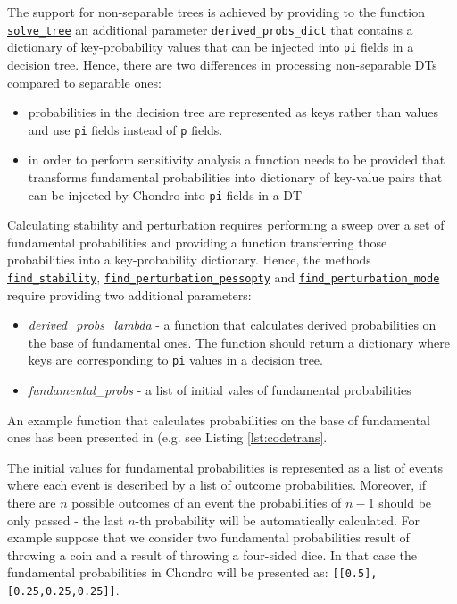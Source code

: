 \documentclass[a4paper,10pt,english]{sphinxmanual}
\begin{document}
The support for non-separable trees is achieved by providing to the function \hyperref[index:chondro.solve_tree]{\texttt{solve\_tree}} an additional parameter \texttt{derived\_probs\_dict} that contains a dictionary of key-probability values that can be injected into \texttt{pi} fields in a decision tree. Hence, there are two differences in processing non-separable DTs compared to separable ones:
\begin{itemize}
	\item probabilities in the decision tree are represented as keys rather than values and use \texttt{pi} fields instead of \texttt{p} fields. 
	\item in order to perform sensitivity analysis a function needs to be provided that transforms fundamental probabilities into dictionary of key-value pairs that can be injected by Chondro into \texttt{pi} fields in a DT
\end{itemize}


Calculating stability and perturbation requires performing a sweep over a set of fundamental probabilities and providing a function transferring those probabilities into a key-probability dictionary. Hence, the methods  \hyperref[index:chondro.find_stability]{\texttt{find\_stability}},  \hyperref[index:chondro.find_perturbation_pessopty]{
		\texttt{find\_perturbation\_pessopty}} and \hyperref[index:chondro.find_perturbation_mode]{
		\texttt{find\_perturbation\_mode}} require providing two additional parameters:
\begin{itemize}
	\item \emph{derived\_probs\_lambda} - a function that calculates derived probabilities     on the  base of fundamental ones. The function should return a dictionary where keys are corresponding to \texttt{pi} values in a decision tree.
	
	\item \emph{fundamental\_probs} - a list of initial vales of fundamental probabilities
\end{itemize}
	
An example function that calculates probabilities on the base of fundamental ones has been presented in (e.g. see Listing \ref{lst:codetrans}. 

The initial values for fundamental probabilities is represented as a list of events where each event is described by a list of outcome probabilities. Moreover, if there are $n$ possible outcomes of an event the probabilities of $n-1$ should be only passed - the last $n$-th probability will be automatically calculated.
For example suppose that we consider two fundamental probabilities result of throwing a coin and a result of throwing a four-sided dice. In that case the fundamental probabilities in Chondro will be presented as: \texttt{[[0.5],[0.25,0.25,0.25]]}. 
\end{document}
